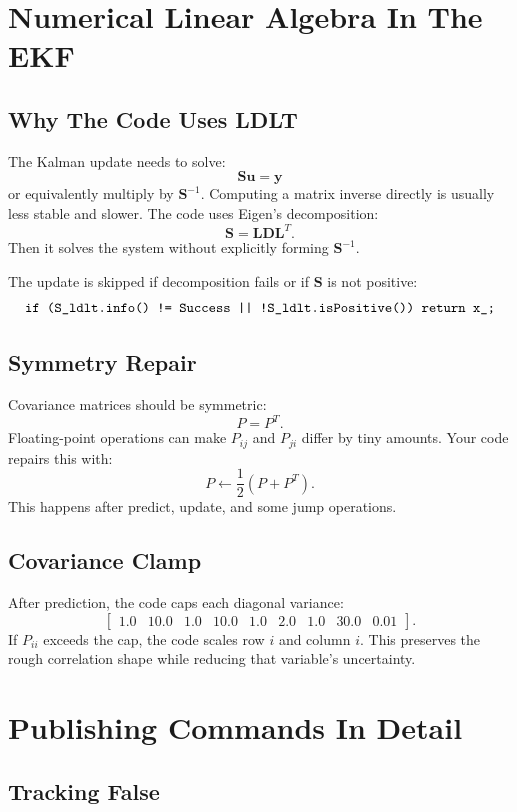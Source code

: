 \documentclass[11pt,a4paper]{article}
\newcommand{\code}[1]{\ifmmode\text{\ttfamily\detokenize{#1}}\else\texttt{\detokenize{#1}}\fi}
\newcommand{\vect}[1]{\bm{#1}}
\newcommand{\mat}[1]{\mathbf{#1}}
\begin{document}
\section{Numerical Linear Algebra In The EKF}

\subsection{Why The Code Uses LDLT}

The Kalman update needs to solve:
\[
  \mat{S}\vect{u}=\vect{y}
\]
or equivalently multiply by \(\mat{S}^{-1}\).
Computing a matrix inverse directly is usually less stable and slower.
The code uses Eigen's \code{LDLT} decomposition:
\[
  \mat{S} = \mat{L}\mat{D}\mat{L}^{T}.
\]
Then it solves the system without explicitly forming \(\mat{S}^{-1}\).

The update is skipped if decomposition fails or if \(\mat{S}\) is not positive:
\[
  \code{if (S_ldlt.info() != Success || !S_ldlt.isPositive()) return x_;}
\]

\subsection{Symmetry Repair}

Covariance matrices should be symmetric:
\[
  P=P^T.
\]
Floating-point operations can make \(P_{ij}\) and \(P_{ji}\) differ by tiny amounts.
Your code repairs this with:
\[
  P\leftarrow\frac{1}{2}(P+P^T).
\]
This happens after predict, update, and some jump operations.

\subsection{Covariance Clamp}

After prediction, the code caps each diagonal variance:
\[
\begin{bmatrix}
1.0&10.0&1.0&10.0&1.0&2.0&1.0&30.0&0.01
\end{bmatrix}.
\]
If \(P_{ii}\) exceeds the cap, the code scales row \(i\) and column \(i\).
This preserves the rough correlation shape while reducing that variable's uncertainty.

\section{Publishing Commands In Detail}

\subsection{Tracking False}
\end{document}
